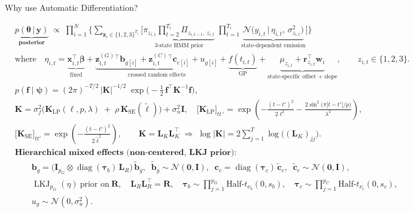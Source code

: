 \documentclass[dvipsnames, aspectratio=169]{beamer}
\begin{document}
\begin{frame}{Why use Automatic Differentiation?}

\tiny
\begin{align*}
&\underbrace{p\!\left(
\boldsymbol{\theta} \,\big|\, \mathbf y
\right)}_{\textbf{posterior}}
\;\propto\;
\prod_{i=1}^{N}
\Bigg\{
\sum_{\mathbf z_i \in \{1,2,3\}^{T_i}}
\!\Bigg[
\underbrace{\pi_{z_{i,1}}\prod_{t=2}^{T_i}\Pi_{z_{i,t-1},\,z_{i,t}}}_{\text{3-state HMM prior}}
\;
\prod_{t=1}^{T_i}
\underbrace{\mathcal N\!\Big(
y_{i,t}\,\Big|\,\eta_{i,t},\,\sigma_{z_{i,t}}^{2}
\Big)}_{\text{state-dependent emission}}
\Bigg]
\Bigg\}
\\[-2pt]
&\text{where}\quad
\eta_{i,t}
=\underbrace{\mathbf x_{i,t}^{\!\top}\boldsymbol\beta}_{\text{fixed}}
+\underbrace{\mathbf z^{(G)}_{i,t}{}^{\!\top}\mathbf b_{g[i]}
+\mathbf z^{(C)}_{i,t}{}^{\!\top}\mathbf c_{c[i]}
+u_{g[i]}}_{\text{crossed random effects}}
+\underbrace{f(t_{i,t})}_{\text{GP}}
+\underbrace{\mu_{z_{i,t}}
+\mathbf r_{z_{i,t}}^{\!\top}\mathbf w_i}_{\text{state-specific offset + slope}}
,\qquad z_{i,t}\in\{1,2,3\}.
\\[4pt]
&
p(\mathbf f\mid\boldsymbol\psi)
=
(2\pi)^{-T/2}\,|\mathbf K|^{-1/2}\;
\exp\!\Big(-\tfrac12\,\mathbf f^{\!\top}\mathbf K^{-1}\mathbf f\Big),
\\[-2pt]
&
\mathbf K
=\sigma_f^{2}\Big(\mathbf K_{\text{LP}}(\ell,p,\lambda)\;+\;\rho\,\mathbf K_{\text{SE}}(\tilde\ell)\Big)
+\sigma_n^{2}\mathbf I,\quad
\big[\mathbf K_{\text{LP}}\big]_{t t\,'}
=\exp\!\left(
-\frac{(t-t')^{2}}{2\ell^{2}}
-\frac{2\sin^{2}\!\big(\pi|t-t'|/p\big)}{\lambda^{2}}
\right),
\\[-2pt]
&
\big[\mathbf K_{\text{SE}}\big]_{t t'}
=
\exp\!\left(-\frac{(t-t')^{2}}{2\tilde\ell^{2}}\right),
\qquad
\mathbf K=\mathbf L_K\mathbf L_K^{\!\top}
\;\Rightarrow\;
\log|\mathbf K|=2\sum_{j=1}^{T}\log \big((\mathbf L_K)_{jj}\big).
\\[6pt]
&\textbf{Hierarchical mixed effects (non-centered, LKJ prior):}
\\[-2pt]
&\qquad
\mathbf b_{g}=\big(\mathbf I_{p_G}\otimes\operatorname{diag}(\boldsymbol\tau_b)\,\mathbf L_R\big)\,\tilde{\mathbf b}_{g},
\;\;
\tilde{\mathbf b}_{g}\sim\mathcal N(\mathbf 0,\mathbf I),
\;\;
\mathbf c_{c}=\operatorname{diag}(\boldsymbol\tau_c)\,\tilde{\mathbf c}_{c},
\;\;
\tilde{\mathbf c}_{c}\sim\mathcal N(\mathbf 0,\mathbf I),
\\[-2pt]
&\qquad
\operatorname{LKJ}_{p_G}(\eta)\ \text{prior on}\ \mathbf R,\quad
\mathbf L_R\mathbf L_R^{\!\top}=\mathbf R,
\quad
\boldsymbol\tau_b\sim\prod_{j=1}^{p_G}\text{Half-}t_{\nu_b}(0,s_b),
\quad
\boldsymbol\tau_c\sim\prod_{j=1}^{p_C}\text{Half-}t_{\nu_c}(0,s_c),
\\[-2pt]
&\qquad
u_g\sim\mathcal N(0,\sigma_u^2).
\end{align*}
\end{frame}
\end{document}
